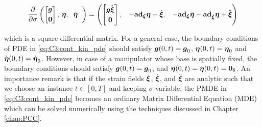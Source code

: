 \begin{equation}
\frac{\partial }{\partial \sigma} 
\begin{pmatrix}
\begin{bmatrix} {\boldsymbol{g}} \\[0.25em] \boldsymbol{0} 
\end{bmatrix},
\,{\boldsymbol{\eta}},\;
\;\dot{{\boldsymbol{\eta}}}\;\;
\end{pmatrix} = \begin{pmatrix}
\begin{bmatrix} {\boldsymbol{g}} \hat{{\boldsymbol{\xi}}} \\[0.25em] \boldsymbol{0} 
\end{bmatrix}
, & -\textbf{ad}_{\boldsymbol{\xi}}\boldsymbol{\eta} + \dot{\boldsymbol{\xi}}, & -\textbf{ad}_{\boldsymbol{\xi}}\dot{{\boldsymbol{\eta}}} -\textbf{ad}_{\dot{{\boldsymbol{\xi}}}}{\boldsymbol{\eta}}  + \ddot{\boldsymbol{\xi}}
\label{eq:C3:cont_kin_pde}
\end{pmatrix}
\end{equation}

\noindent which is a square differential matrix. For a general case, the boundary conditions of PDE in \eqref{eq:C3:cont_kin_pde} should satisfy ${\boldsymbol{g}}(0,t) = {\boldsymbol{g}}_0$, ${\boldsymbol{\eta}}(0,t) = {\boldsymbol{\eta}}_0$ and $\dot{{\boldsymbol{\eta}}}(0,t) = \dot{{\boldsymbol{\eta}}}_0$. However, in case of a manipulator whose base is spatially fixed, the boundary conditions should satisfy ${\boldsymbol{g}}(0,t) = {\boldsymbol{g}}_0$, and ${\boldsymbol{\eta}}(0,t) = \dot{{\boldsymbol{\eta}}}(0,t) = \boldsymbol{0}_6$. An importance remark is that if the strain fields ${\boldsymbol{\xi}}$, $\dot{{\boldsymbol{\xi}}}$, and $\ddot{{\boldsymbol{\xi}}}$ are analytic such that we choose an instance $t \in [0,T]$ and keeping $\sigma$ variable, the PMDE in \eqref{eq:C3:cont_kin_pde} becomes an ordinary Matrix Differential Equation (MDE) which can be solved numerically using the techniques discussed in Chapter \ref{chap:PCC}. 

